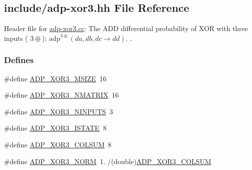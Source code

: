 \hypertarget{adp-xor3_8hh}{\subsection{include/adp-\/xor3.hh \-File \-Reference}
\label{adp-xor3_8hh}
}


\-Header file for \hyperlink{adp-xor3_8cc}{adp-\/xor3.\-cc}\-: \-The \-A\-D\-D differential probability of \-X\-O\-R with three inputs ( $3\oplus$)\-: $\mathrm{adp}^{3\oplus}(da,db,dc \rightarrow dd)$. .  


\subsubsection*{\-Defines}
\begin{DoxyCompactItemize}
\item 
\#define \hyperlink{adp-xor3_8hh_a44970ca3d1b5bb0251613968c48db0c7}{\-A\-D\-P\-\_\-\-X\-O\-R3\-\_\-\-M\-S\-I\-Z\-E}~16
\item 
\#define \hyperlink{adp-xor3_8hh_af5ad45e54a0b7ea0526ddd1aaf8847b7}{\-A\-D\-P\-\_\-\-X\-O\-R3\-\_\-\-N\-M\-A\-T\-R\-I\-X}~16
\item 
\#define \hyperlink{adp-xor3_8hh_ac12bce772d25baa53cedd90e8e59af2b}{\-A\-D\-P\-\_\-\-X\-O\-R3\-\_\-\-N\-I\-N\-P\-U\-T\-S}~3
\item 
\#define \hyperlink{adp-xor3_8hh_af7604ba4f09378ef2f468d63d87dc4f9}{\-A\-D\-P\-\_\-\-X\-O\-R3\-\_\-\-I\-S\-T\-A\-T\-E}~8
\item 
\#define \hyperlink{adp-xor3_8hh_a2733f830ea99b07e3aa5282aa377de3b}{\-A\-D\-P\-\_\-\-X\-O\-R3\-\_\-\-C\-O\-L\-S\-U\-M}~8
\item 
\#define \hyperlink{adp-xor3_8hh_a585546e1f08d3337b30a1770eab27dba}{\-A\-D\-P\-\_\-\-X\-O\-R3\-\_\-\-N\-O\-R\-M}~1. /(double)\hyperlink{adp-xor3_8hh_a2733f830ea99b07e3aa5282aa377de3b}{\-A\-D\-P\-\_\-\-X\-O\-R3\-\_\-\-C\-O\-L\-S\-U\-M}
\end{DoxyCompactItemize}
